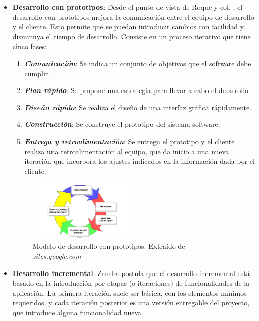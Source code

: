 \begin{itemize}
    \item \textbf{Desarrollo con prototipos}: Desde el punto de vista de Roque y col. \autocite*{RoqueHernandez2015}, el desarrollo con 
    prototipos mejora la comunicación entre el equipo de desarrollo y el cliente. Esto permite que se puedan introducir cambios con 
    facilidad y disminuya el tiempo de desarrollo. Consiste en un proceso iterativo que tiene cinco fases:

    \begin{enumerate}
        \item \textbf{\textit{Comunicación}}: Se indica un conjunto de objetivos que el software debe cumplir.
        \item \textbf{\textit{Plan rápido}}: Se propone una estrategia para llevar a cabo el desarrollo
        \item \textbf{\textit{Diseño rápido}}: Se realiza el diseño de una interfaz gráfica rápidamente.
        \item \textbf{\textit{Construcción}}: Se construye el prototipo del sistema software.
        \item \textbf{\textit{Entrega y retroalimentación}}: Se entrega el prototipo y el cliente realiza una 
        retroalimentación al equipo, que da inicio a una nueva iteración que incorpora los ajustes indicados en la 
        información dada por el cliente.
    \end{enumerate}\medskip
    
    \begin{figure}[H]
        \centering
        \includegraphics[width=5cm]{Figures/modelo_prototipos.jpeg}
        \caption{Modelo de desarrollo con prototipos. Extraído de \textit{sites.google.com} \autocite*{Prototipos}}
    \end{figure}

    \item \textbf{Desarrollo incremental}: Zumba \autocite*{Zumba2018} postula que el desarrollo incremental 
    está basado en la introducción por etapas (o iteraciones) de funcionalidades de la aplicación. La primera 
    iteración suele ser básica, con los elementos mínimos requeridos, y cada iteración posterior es una versión 
    entregable del proyecto, que introduce alguna funcionalidad nueva. \medskip


\end{itemize}
